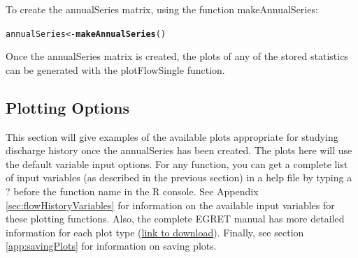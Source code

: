 \documentclass[a4paper,11pt]{article}\usepackage{graphicx, color}
\makeatletter
\newcommand{\hlfunctioncall}[1]{\textcolor[rgb]{0.501960784313725,0,0.329411764705882}{\textbf{#1}}}%
\newenvironment{kframe}{%
 \def\at@end@of@kframe{}%
 \ifinner\ifhmode%
  \def\at@end@of@kframe{\end{minipage}}%
  \begin{minipage}{\columnwidth}%
 \fi\fi%
 \def\FrameCommand##1{\hskip\@totalleftmargin \hskip-\fboxsep
 \colorbox{shadecolor}{##1}\hskip-\fboxsep
     \hskip-\linewidth \hskip-\@totalleftmargin \hskip\columnwidth}%
 \MakeFramed {\advance\hsize-\width
   \@totalleftmargin\z@ \linewidth\hsize
   \@setminipage}}%
 {\par\unskip\endMakeFramed%
 \at@end@of@kframe}
\newenvironment{knitrout}{}{} %
\makeatother
\begin{document}
To create the annualSeries matrix, using the function makeAnnualSeries:
\begin{knitrout}
\color{fgcolor}\begin{kframe}
\begin{alltt}
annualSeries <- \hlfunctioncall{makeAnnualSeries}()
\end{alltt}
\end{kframe}
\end{knitrout}


Once the annualSeries matrix is created, the plots of any of the stored statistics can be generated with the plotFlowSingle function.

\FloatBarrier

\subsection{Plotting Options}
\label{sec:plotOptions}

\FloatBarrier

This section will give examples of the available plots appropriate for studying discharge history once the annualSeries has been created. The plots here will use the default variable input options.  For any function, you can get a complete list of input variables (as described in the previous section) in a help file by typing a ? before the function name in the R console. See Appendix \ref{sec:flowHistoryVariables} for information on the available input variables for these plotting functions. Also, the complete EGRET manual has more detailed information for each plot type (\href{https://github.com/USGS-R/EGRET/raw/Documentation/EGRET%2Bmanual_4.doc}{link to download}). Finally, see section \ref{app:savingPlots} for information on saving plots.
\end{document}
